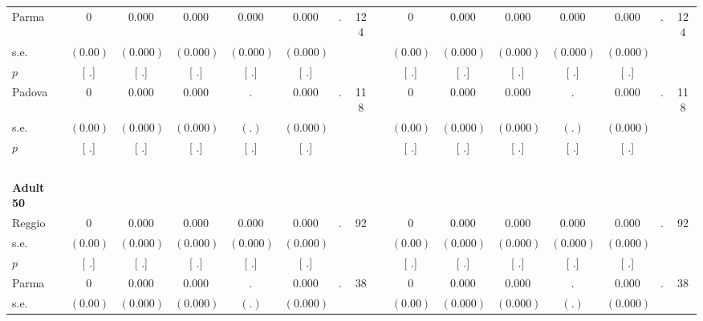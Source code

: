 \begin{longtable}{L{8em} c c c c c c c p{1em} c c c c c c c}
\quad \quad \quad Parma& 0 &     0.000 &     0.000 &     0.000 &     0.000 &         . &       124 & & 0 &     0.000 &     0.000 &     0.000 &     0.000 &         . &       124  \\*
\quad \quad \quad \quad s.e.& $ (     0.00)$ & $ (    0.000)$ & $ (    0.000)$ & $ (    0.000)$ & $ (    0.000)$ & & & & $ (     0.00)$ & $ (    0.000)$ & $ (    0.000)$ & $ (    0.000)$ & $ (    0.000)$ & &  \\*
\quad \quad \quad \quad $ p$ & [        .] & [        .] & [        .] & [        .] & [        .] & & & & [        .] & [        .] & [        .] & [        .] & [        .] & &  \\[1em]
\quad \quad \quad Padova& 0 &     0.000 &     0.000 &         . &     0.000 &         . &       118 & & 0 &     0.000 &     0.000 &         . &     0.000 &         . &       118  \\*
\quad \quad \quad \quad s.e.& $ (     0.00)$ & $ (    0.000)$ & $ (    0.000)$ & $ (        .)$ & $ (    0.000)$ & & & & $ (     0.00)$ & $ (    0.000)$ & $ (    0.000)$ & $ (        .)$ & $ (    0.000)$ & &  \\*
\quad \quad \quad \quad $ p$ & [        .] & [        .] & [        .] & [        .] & [        .] & & & & [        .] & [        .] & [        .] & [        .] & [        .] & &  \\[1em]
~\\[1em]
\quad \quad \textbf{Adult 50} & & & & & & & & & & & & & & & \\* 
\quad \quad \quad Reggio& 0 &     0.000 &     0.000 &     0.000 &     0.000 &         . &        92 & & 0 &     0.000 &     0.000 &     0.000 &     0.000 &         . &        92  \\*
\quad \quad \quad \quad s.e.& $ (     0.00)$ & $ (    0.000)$ & $ (    0.000)$ & $ (    0.000)$ & $ (    0.000)$ & & & & $ (     0.00)$ & $ (    0.000)$ & $ (    0.000)$ & $ (    0.000)$ & $ (    0.000)$ & &  \\*
\quad \quad \quad \quad $ p$ & [        .] & [        .] & [        .] & [        .] & [        .] & & & & [        .] & [        .] & [        .] & [        .] & [        .] & &  \\[1em]
\quad \quad \quad Parma& 0 &     0.000 &     0.000 &         . &     0.000 &         . &        38 & & 0 &     0.000 &     0.000 &         . &     0.000 &         . &        38  \\*
\quad \quad \quad \quad s.e.& $ (     0.00)$ & $ (    0.000)$ & $ (    0.000)$ & $ (        .)$ & $ (    0.000)$ & & & & $ (     0.00)$ & $ (    0.000)$ & $ (    0.000)$ & $ (        .)$ & $ (    0.000)$ & &  \\*

\end{longtable}
